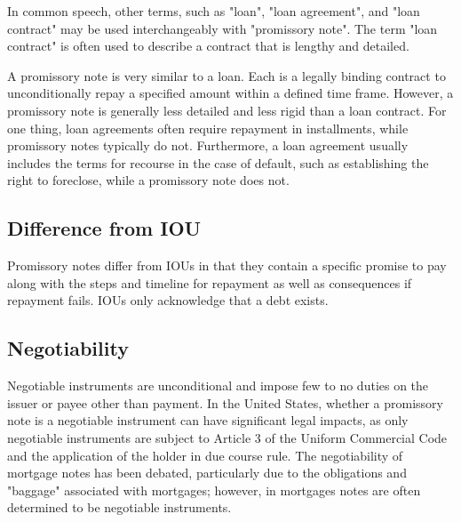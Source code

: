 In common speech, other terms, such as "loan", "loan agreement", and "loan contract" may
be used interchangeably with "promissory note". The term "loan contract" is often used to
describe a contract that is lengthy and detailed.



A promissory note is very similar to a loan. Each is a legally binding contract to
unconditionally repay a specified amount within a defined time frame. However, a
promissory note is generally less detailed and less rigid than a loan contract. For one
thing, loan agreements often require repayment in installments, while promissory notes
typically do not. Furthermore, a loan agreement usually includes the terms for recourse in
the case of default, such as establishing the right to foreclose, while a promissory note
does not.




\subsection{Difference from IOU}
\label{sss:diff-a0dd}




Promissory notes differ from IOUs in that they contain a specific promise to pay along
with the steps and timeline for repayment as well as consequences if repayment fails. IOUs
only acknowledge that a debt exists.




\subsection{Negotiability}
\label{sss:nego-1656}




Negotiable instruments are unconditional and impose few to no duties on the issuer or
payee other than payment. In the United States, whether a promissory note is a negotiable
instrument can have significant legal impacts, as only negotiable instruments are subject
to Article 3 of the Uniform Commercial Code and the application of the holder in due
course rule. The negotiability of mortgage notes has been debated, particularly due to the
obligations and "baggage" associated with mortgages; however, in mortgages notes are often
determined to be negotiable instruments.




